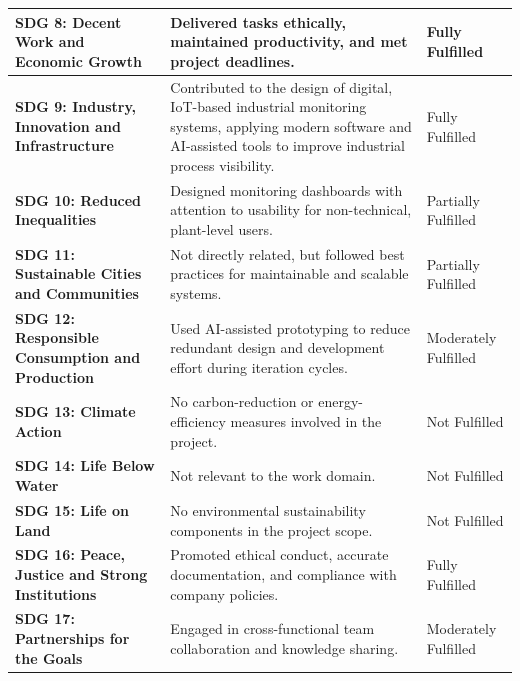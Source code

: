 \begin{longtable}{|p{5.3cm}|p{6.3cm}|p{3cm}|}
\textbf{SDG 8: Decent Work and Economic Growth} & Delivered tasks ethically, maintained productivity, and met project deadlines. & Fully Fulfilled \\
\hline

\textbf{SDG 9: Industry, Innovation and Infrastructure} & Contributed to the design of digital, IoT-based industrial monitoring systems, applying modern software and AI-assisted tools to improve industrial process visibility. & Fully Fulfilled \\
\hline

\textbf{SDG 10: Reduced Inequalities} & Designed monitoring dashboards with attention to usability for non-technical, plant-level users. & Partially Fulfilled \\
\hline

\textbf{SDG 11: Sustainable Cities and Communities} & Not directly related, but followed best practices for maintainable and scalable systems. & Partially Fulfilled \\
\hline

\textbf{SDG 12: Responsible Consumption and Production} & Used AI-assisted prototyping to reduce redundant design and development effort during iteration cycles. & Moderately Fulfilled \\
\hline

\textbf{SDG 13: Climate Action} & No carbon-reduction or energy-efficiency measures involved in the project. & Not Fulfilled \\
\hline

\textbf{SDG 14: Life Below Water} & Not relevant to the work domain. & Not Fulfilled \\
\hline

\textbf{SDG 15: Life on Land} & No environmental sustainability components in the project scope. & Not Fulfilled \\
\hline

\textbf{SDG 16: Peace, Justice and Strong Institutions} & Promoted ethical conduct, accurate documentation, and compliance with company policies. & Fully Fulfilled \\
\hline

\textbf{SDG 17: Partnerships for the Goals} & Engaged in cross-functional team collaboration and knowledge sharing. & Moderately Fulfilled \\
\hline
\end{longtable}

